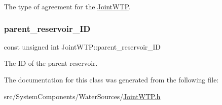 The type of agreement for the \mbox{\hyperlink{classJointWTP}{Joint\+W\+TP}}. 

\mbox{\label{classJointWTP_aa5830cb4d3013a004b7168f4dbf475eb}} 
\subsubsection{\texorpdfstring{parent\+\_\+reservoir\+\_\+\+ID}{parent\_reservoir\_ID}}
{\footnotesize\ttfamily const unsigned int Joint\+W\+T\+P\+::parent\+\_\+reservoir\+\_\+\+ID}



The ID of the parent reservoir. 



The documentation for this class was generated from the following file\+:\begin{DoxyCompactItemize}
\item 
src/\+System\+Components/\+Water\+Sources/\mbox{\hyperlink{JointWTP_8h}{Joint\+W\+T\+P.\+h}}\end{DoxyCompactItemize}
